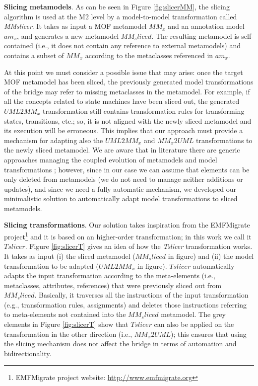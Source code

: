%
\textbf{Slicing metamodels}. As can be seen in Figure \ref{fig:slicerMM}, the slicing algorithm is used at the M2 level by a model-to-model transformation called \textit{MMslicer}.
It takes as input a MOF metamodel $MM_x$ and an annotation model $am_x$, and generates a new metamodel $MM_sliced$. 
The resulting metamodel is self-contained (i.e., it does not contain any reference to external metamodels)
and contains a subset of $MM_x$ according to the metaclasses referenced in $am_x$.

At this point we must consider a possible issue that may arise: once the target MOF metamodel has been sliced, the
previously generated model transformations of the bridge may refer to missing metaclasses in the metamodel.
For example, if all the concepts related to state machines have been sliced out, the generated $UML2MM_x$ transformation still contains
transformation rules for transforming states, transitions, etc.; so, it is not aligned with the newly sliced metamodel and its execution will be erroneous. 
This implies that our approach must provide a mechanism for adapting also the $UML2MM_x$ and $MM_x2UML$ transformations
to the newly sliced metamodel.
We are aware that in literature there are generic approaches managing the coupled evolution of metamodels and model transformations
\cite{TransEvolution}; however, since in our case we can assume that elements
can be only deleted from metamodels (we do not need to manage neither additions or updates), and since we need a fully automatic mechanism, we developed our minimalistic solution to automatically adapt model transformations to sliced metamodels.

\textbf{Slicing transformations}. 
Our solution takes inspiration from the EMFMigrate project\footnote{EMFMigrate project website: \small{\url{http://www.emfmigrate.org}}}
and it is based on an higher-order transformation; in this work we call it $Tslicer$.
Figure \ref{fig:slicerT} gives an idea of how the \textit{Tslicer} transformation works. It takes as input (i) the sliced metamodel
($MM_sliced$ in figure) and (ii) the model transformation to be adapted ($UML2MM_x$ in figure). $Tslicer$ automatically adapts the input transformation according to the meta-elements (i.e., metaclasses, attributes, references) that were previously sliced out from $MM_sliced$. 
Basically, it traverses all the instructions of the input transformation (e.g., transformation rules, assignments)
and deletes those instructions referring to meta-elements not contained into the $MM_sliced$ metamodel.
The grey elements in Figure \ref{fig:slicerT} show that $Tslicer$ can also be
applied on the transformation in the other direction (i.e., $MM_x2UML$); this ensures that using the slicing mechanism does not affect
the bridge in terms of automation and bidirectionality. 

